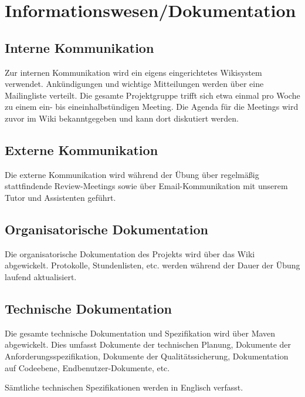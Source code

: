 

\section{Informationswesen/Dokumentation}
\subsection{Interne Kommunikation}
Zur internen Kommunikation wird ein eigens eingerichtetes Wikisystem verwendet.
Ankündigungen und wichtige Mitteilungen werden über eine Mailingliste verteilt.
Die gesamte Projektgruppe trifft sich etwa einmal pro Woche zu einem ein- bis eineinhalbstündigen Meeting.
Die Agenda für die Meetings wird zuvor im Wiki bekanntgegeben und kann dort diskutiert werden.

\subsection{Externe Kommunikation}
Die externe Kommunikation wird während der Übung über regelmäßig stattfindende Review-Meetings sowie über Email-Kommunikation mit unserem Tutor und Assistenten geführt.

\subsection{Organisatorische Dokumentation}
Die organisatorische Dokumentation des Projekts wird über das Wiki abgewickelt.
Protokolle, Stundenlisten, etc. werden während der Dauer der Übung laufend aktualisiert.

\subsection{Technische Dokumentation}
Die gesamte technische Dokumentation und Spezifikation wird über Maven abgewickelt.
Dies umfasst Dokumente der technischen Planung, Dokumente der Anforderungsspezifikation,
Dokumente der Qualitätssicherung, Dokumentation auf Codeebene, Endbenutzer-Dokumente, etc.

Sämtliche technischen Spezifikationen werden in Englisch verfasst.
